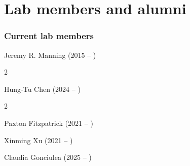 \documentclass{tufte-book} %
\begin{document}
\chapter{Lab members and alumni}\label{ch:members}
\begin{fullwidth}
\subsection{Current lab members}\label{sec:curr_members}
\bigskip

\enskip Jeremy R. Manning (2015 -- )

\begin{multicols}{2}\raggedcolumns
  \begin{list}{\quad}{}
    \item Hung-Tu Chen (2024 -- )
  \end{list}
\end{multicols}

\begin{multicols}{2}\raggedcolumns
\begin{list}{\quad}{}
\item Paxton Fitzpatrick (2021 -- )
\item Xinming Xu (2021 -- )
\item Claudia Gonciulea (2025 -- )
\end{list}
\end{multicols}






\end{fullwidth}
\end{document}
